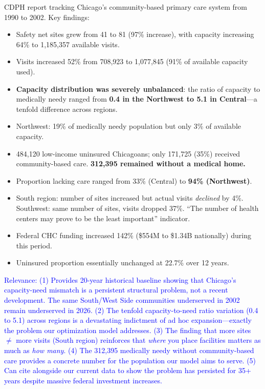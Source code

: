\documentclass[11pt]{article}
\begin{document}
\begin{enumerate}
CDPH report tracking Chicago's community-based primary care system from 1990 to 2002. Key findings:
\begin{itemize}
    \item Safety net sites grew from 41 to 81 (97\% increase), with capacity increasing 64\% to 1,185,357 available visits.
    \item Visits increased 52\% from 708,923 to 1,077,845 (91\% of available capacity used).
    \item \textbf{Capacity distribution was severely unbalanced}: the ratio of capacity to medically needy ranged from \textbf{0.4 in the Northwest to 5.1 in Central}---a tenfold difference across regions.
    \item Northwest: 19\% of medically needy population but only 3\% of available capacity.
    \item 484,120 low-income uninsured Chicagoans; only 171,725 (35\%) received community-based care. \textbf{312,395 remained without a medical home.}
    \item Proportion lacking care ranged from 33\% (Central) to \textbf{94\% (Northwest)}.
    \item South region: number of sites increased but actual visits \emph{declined} by 4\%. Southwest: same number of sites, visits dropped 37\%. ``The number of health centers may prove to be the least important'' indicator.
    \item Federal CHC funding increased 142\% (\$554M to \$1.34B nationally) during this period.
    \item Uninsured proportion essentially unchanged at 22.7\% over 12 years.
\end{itemize}

\textcolor{blue}{Relevance: (1) Provides 20-year historical baseline showing that Chicago's capacity-need mismatch is a persistent structural problem, not a recent development. The same South/West Side communities underserved in 2002 remain underserved in 2026. (2) The tenfold capacity-to-need ratio variation (0.4 to 5.1) across regions is a devastating indictment of ad hoc expansion---exactly the problem our optimization model addresses. (3) The finding that more sites $\neq$ more visits (South region) reinforces that \emph{where} you place facilities matters as much as \emph{how many}. (4) The 312,395 medically needy without community-based care provides a concrete number for the population our model aims to serve. (5) Can cite alongside our current data to show the problem has persisted for 35+ years despite massive federal investment increases.}

\end{enumerate}
\end{document}
